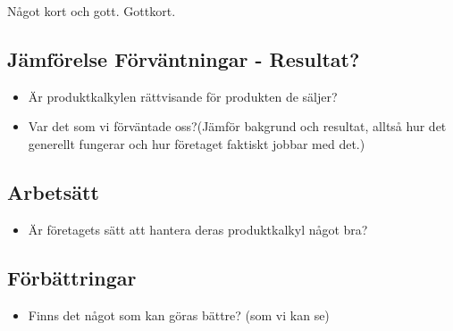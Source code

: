 Något kort och gott.
Gottkort.

%
%

\subsection{Jämförelse Förväntningar - Resultat?}
\begin{itemize}
    \item Är produktkalkylen rättvisande för produkten de säljer?
    \item Var det som vi förväntade oss?(Jämför bakgrund och resultat, alltså hur det generellt fungerar och hur företaget faktiskt jobbar med det.)
\end{itemize}

%
%

\subsection{Arbetsätt}
\begin{itemize}
    \item Är företagets sätt att hantera deras produktkalkyl något bra?
\end{itemize}

%
%

\subsection{Förbättringar}
\begin{itemize}
    \item Finns det något som kan göras bättre? (som vi kan se)
\end{itemize}